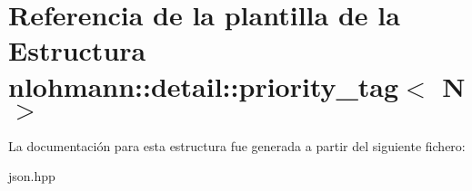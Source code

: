 \hypertarget{structnlohmann_1_1detail_1_1priority__tag}{}\section{Referencia de la plantilla de la Estructura nlohmann\+:\+:detail\+:\+:priority\+\_\+tag$<$ N $>$}
\label{structnlohmann_1_1detail_1_1priority__tag}


La documentación para esta estructura fue generada a partir del siguiente fichero\+:\begin{DoxyCompactItemize}
\item 
json.\+hpp\end{DoxyCompactItemize}
